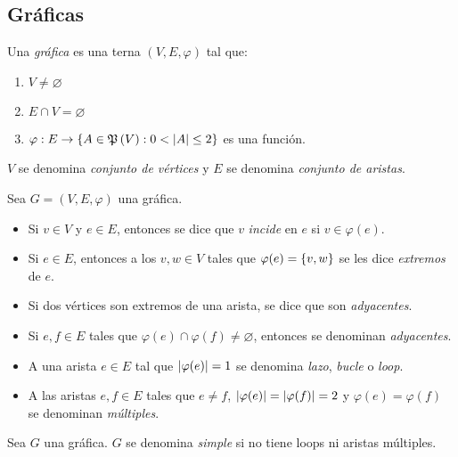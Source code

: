 \subsection{Gráficas}
\begin{definition}[Gráfica]
	Una \emph{gráfica} es una terna $(V, E,\varphi)$ tal que:
	\begin{enumerate}
		\item $V\neq\varnothing$
		\item $E\cap V =\varnothing$
		\item $\varphi : E\to\set{A\in\mpow{V}:0 <\abs{A}\leq 2}$ es una función.
	\end{enumerate}
	$V$ se denomina \emph{conjunto de vértices} y $E$ se denomina \emph{conjunto de aristas}.
\end{definition}
\begin{figure}[H]
	\centering
\end{figure}
\begin{definition}
	Sea $G =(V, E,\varphi)$ una gráfica. 
	\begin{itemize}
		\item Si $v\in V$ y $e\in E$, entonces se dice que $v$ \emph{incide} en $e$ si $v\in\varphi(e)$.
		\item Si $e\in E$, entonces a los $v, w\in V$ tales que $\varphi(e) =\left\{ v, w \right\}$ se les dice \emph{extremos} de $e$.
		\item Si dos vértices son extremos de una arista, se dice que son \emph{adyacentes}.
		\item Si $e, f\in E$ tales que $\varphi(e)\cap\varphi(f)\neq\varnothing$, entonces se denominan \emph{adyacentes}.
		\item A una arista $e\in E$ tal que $\left\vert \varphi(e) \right\vert = 1$ se denomina \emph{lazo}, \emph{bucle} o \emph{loop}.
		\item A las aristas $e, f\in E$ tales que $e\neq f$, $\left\vert \varphi(e) \right\vert =\left\vert \varphi(f) \right\vert = 2$ y $\varphi(e) =\varphi(f)$ se denominan \emph{múltiples}.
	\end{itemize}
\end{definition}
\begin{definition}
	Sea $G$ una gráfica. $G$ se denomina \emph{simple} si no tiene loops ni aristas múltiples.
\end{definition}

